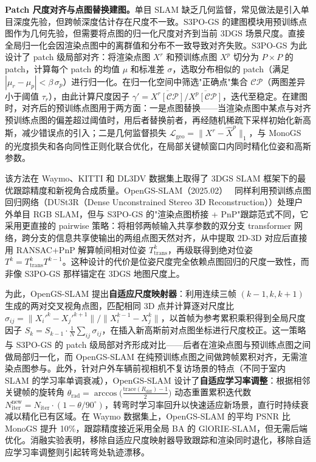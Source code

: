\textbf{Patch 尺度对齐与点图替换建图。}单目 SLAM 缺乏几何监督，常见做法是引入单目深度先验，但跨帧深度估计存在尺度不一致。S3PO-GS 的建图模块用预训练点图作为几何先验，但需要将点图的归一化尺度对齐到当前 3DGS 场景尺度。直接全局归一化会因渲染点图中的离群值和分布不一致导致对齐失败。S3PO-GS 为此设计了 patch 级局部对齐：将渲染点图 $X^r$ 和预训练点图 $X^p$ 切分为 $P \times P$ 的 patch，计算每个 patch 的均值 $\mu$ 和标准差 $\sigma$，选取分布相似的 patch（满足 $|\mu_r - \mu_p| < \beta\,\sigma_p$）进行归一化。在归一化空间中筛选"正确点"集合 $\mathcal{CP}$（两图差异小于阈值 $\tau_r$），由此计算尺度因子 $\gamma' = \overline{X^r[\mathcal{CP}]} / \overline{X^p[\mathcal{CP}]}$，迭代至稳定。在建图时，对齐后的预训练点图用于两方面：一是点图替换——当渲染点图中某点与对齐预训练点图的偏差超过阈值时，用后者替换前者，再经随机稀疏下采样初始化新高斯，减少错误点的引入；二是几何监督损失 $\mathcal{L}_{\mathrm{geo}} = \|X^r - \hat{X}^p\|_1$，与 MonoGS 的光度损失和各向同性正则化联合优化，在局部关键帧窗口内同时精化位姿和高斯参数。

该方法在 Waymo、KITTI 和 DL3DV 数据集上取得了 3DGS SLAM 框架下的最优跟踪精度和新视角合成质量。OpenGS-SLAM（2025.02）~\cite{2502_15633} 同样利用预训练点图回归网络（DUSt3R（Dense Unconstrained Stereo 3D Reconstruction））处理户外单目 RGB SLAM，但与 S3PO-GS 的"渲染点图桥接 + PnP"跟踪范式不同，它采用更直接的 pairwise 策略：将相邻两帧输入共享参数的双分支 transformer 网络，跨分支的信息共享使输出的两组点图天然对齐，从中提取 2D-3D 对应后直接用 RANSAC+PnP 解算帧间相对位姿 $T^k_{\mathrm{trans}}$，再级联得到绝对位姿 $T^k = T^k_{\mathrm{trans}} T^{k-1}$。这种设计的代价是位姿尺度完全依赖点图回归的尺度一致性，而非像 S3PO-GS 那样锚定在 3DGS 地图尺度上。

为此，OpenGS-SLAM 提出\textbf{自适应尺度映射器}：利用连续三帧 $(k{-}1, k, k{+}1)$ 生成的两对交叉视角点图，匹配相同 3D 点并计算逐对尺度比 $\sigma_{ij} = \|X_i'^{k} - X_j'^{k+1}\| / \|X_i^{k-1} - X_j^{k}\|$，以首帧为参考累积乘积得到全局尺度因子 $S_k = S_{k-1} \cdot \frac{1}{N}\sum_{ij} \sigma_{ij}$，在插入新高斯前对点图坐标进行尺度校正。这一策略与 S3PO-GS 的 patch 级局部对齐形成对比——后者在渲染点图与预训练点图之间做局部归一化，而 OpenGS-SLAM 在纯预训练点图之间做跨帧累积对齐，无需渲染点图参与。此外，针对户外车辆前视相机不复访场景的特点（不同于室内 SLAM 的学习率单调衰减），OpenGS-SLAM 设计了\textbf{自适应学习率调整}：根据相邻关键帧的旋转角 $\theta_{\mathrm{rad}} = \arccos\!\bigl(\frac{\mathrm{trace}(R_{\mathrm{diff}}) - 1}{2}\bigr)$ 动态重置累积迭代数 $N_{\mathrm{iter}}^{\mathrm{new}} = N_{\mathrm{iter}} \cdot (1 - \theta / 90^\circ)$，转弯时学习率回升以快速适应新场景，直行时持续衰减以精化已有区域。在 Waymo 数据集上，OpenGS-SLAM 的平均 PSNR 比 MonoGS 提升 10\%，跟踪精度接近采用全局 BA 的 GlORIE-SLAM，但无需后端优化。消融实验表明，移除自适应尺度映射器导致跟踪和渲染同时退化，移除自适应学习率调整则引起转弯处轨迹漂移。

